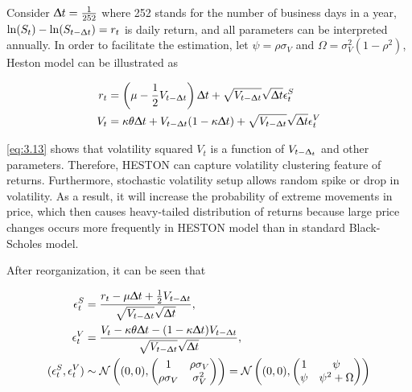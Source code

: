 \documentclass[12pt,a4paper]{article}
\numberwithin{equation}{section}
\begin{document}
Consider $\Updelta t = \frac{1}{252}$ where 252 stands for the number of business days in a year, $\ln(S_t) - \ln(S_{t-\Updelta t}) = r_t$ is daily return, and all parameters can be interpreted annually. In order to facilitate the estimation, let $\psi = \rho \sigma_V$ and $\Omega = \sigma_V^2(1-\rho^2)$, Heston model can be illustrated as 

 \begin{align}
r_t &= \left( \mu - \frac{1}{2}V_{t-\Updelta t} \right) \Updelta t+ \sqrt{V_{t - \Updelta t}} \sqrt{\Updelta t} \epsilon_t^S \label{eq:3.12} \\ 
V_t &= \kappa \theta \Updelta t + V_{t- \Updelta t} (1 - \kappa \Updelta t)  + \sqrt{V_{t - \Updelta t}} \sqrt{\Updelta t} \epsilon_t^V \label{eq:3.13}
\end{align}

\eqref{eq:3.13} shows that volatility squared $V_t$ is a function of $V_{t-\Updelta_t}$ and other parameters. Therefore, HESTON can capture volatility clustering feature of returns. Furthermore, stochastic volatility setup allows random spike or drop in volatility. As a result, it will increase the probability of extreme movements in price, which then causes heavy-tailed distribution of returns because large price changes occurs more frequently in HESTON model than in standard Black-Scholes model. 

After reorganization, it can be seen that

\begin{align*}
\epsilon_t^S &= \frac{r_t - \mu \Updelta t + \frac{1}{2} V_{t-\Updelta t}}{\sqrt{V_{t-\Updelta t}}\sqrt{\Updelta t}}, \\
\epsilon_t^V &= \frac{V_t - \kappa \theta \Updelta t - (1-\kappa \Updelta t) V_{t-\Updelta t}}{\sqrt{V_{t-\Updelta t}}\sqrt{\Updelta t}},\\
(\epsilon_t^S, \epsilon_t^V) &\sim \mathcal{N}\left( (0,0), \begin{pmatrix}
											1 & \rho \sigma_V\\
											\rho \sigma_V & \sigma_V^2
										    \end{pmatrix} \right) = \mathcal{N} \left((0,0) , \begin{pmatrix}
																				1 & \psi \\
																				\psi  & \psi^2 + \Omega
										    									  \end{pmatrix} \right)
\end{align*}
\end{document}
